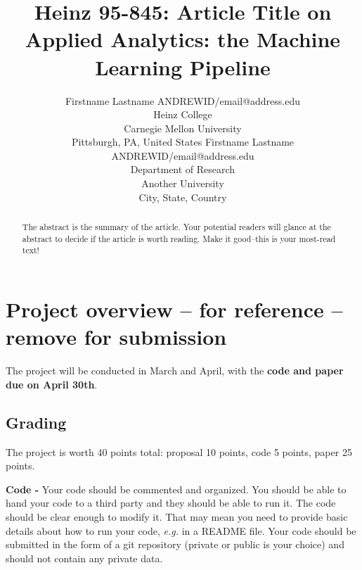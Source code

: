 \documentclass[twoside,11pt]{article}
\begin{document}
\title{Heinz 95-845: Article Title on \\ Applied Analytics: the Machine Learning Pipeline}

\author{\name Firstname Lastname \email ANDREWID/email@address.edu \\
       \addr Heinz College\\
       Carnegie Mellon University\\
       Pittsburgh, PA, United States
       \AND
       \name Firstname Lastname \email ANDREWID/email@address.edu \\
       \addr Department of Research\\
       Another University \\
       City, State, Country} 

\maketitle

\begin{abstract}
  The abstract is the summary of the article. Your potential readers will glance at the abstract to decide
  if the article is worth reading. Make it good--this is your most-read text!  
\end{abstract}

\section{Project overview -- for reference -- remove for submission}

The project will be conducted in March and April, with the \textbf{code and paper due on April 30th}.

\subsection{Grading}
The project is worth 40 points total: proposal 10 points, code 5 points, paper 25 points.


\textbf{Code -} Your code should be commented and organized. You should be able to hand your code to a third party and they should be able to run it. The code should be clear enough to modify it. That may mean you need to provide basic details about how to run your code, \emph{e.g.} in a README file. Your code should be submitted in the form of a git repository (private or public is your choice) and should not contain any private data. 
\end{document}
